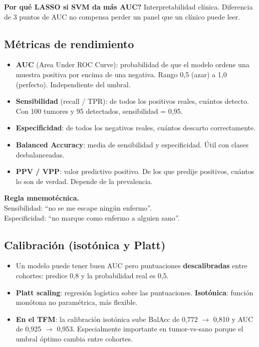 \documentclass[11pt, a4paper]{article}
\begin{document}
\begin{tipbox}
\textbf{Por qu\'e LASSO si SVM da m\'as AUC?} Interpretabilidad cl\'inica. Diferencia de 3 puntos de AUC no compensa perder un panel que un cl\'inico puede leer.
\end{tipbox}

\subsection{M\'etricas de rendimiento}

\begin{itemize}[leftmargin=1.2em, itemsep=2pt]
  \item \textbf{AUC} (Area Under ROC Curve): probabilidad de que el modelo ordene una muestra positiva por encima de una negativa. Rango 0,5 (azar) a 1,0 (perfecto). Independiente del umbral.
  \item \textbf{Sensibilidad} (recall / TPR): de todos los positivos reales, cu\'antos detecto. Con 100 tumores y 95 detectados, sensibilidad = 0,95.
  \item \textbf{Especificidad}: de todos los negativos reales, cu\'antos descarto correctamente.
  \item \textbf{Balanced Accuracy}: media de sensibilidad y especificidad. \'Util con clases desbalanceadas.
  \item \textbf{PPV / VPP}: valor predictivo positivo. De los que predije positivos, cu\'antos lo son de verdad. Depende de la prevalencia.
\end{itemize}

\begin{tipbox}
\textbf{Regla mnemot\'ecnica.}\\
Sensibilidad: ``no se me escape ning\'un enfermo''.\\
Especificidad: ``no marque como enfermo a alguien sano''.
\end{tipbox}

\subsection{Calibraci\'on (isot\'onica y Platt)}

\begin{itemize}[leftmargin=1.2em, itemsep=2pt]
  \item Un modelo puede tener buen AUC pero puntuaciones \textbf{descalibradas} entre cohortes: predice 0,8 y la probabilidad real es 0,5.
  \item \textbf{Platt scaling}: regresi\'on log\'istica sobre las puntuaciones. \textbf{Isot\'onica}: funci\'on mon\'otona no param\'etrica, m\'as flexible.
  \item \textbf{En el TFM}: la calibraci\'on isot\'onica sube BalAcc de 0,772 $\to$ 0,810 y AUC de 0,925 $\to$ 0,953. Especialmente importante en tumor-vs-sano porque el umbral \'optimo cambia entre cohortes.
\end{itemize}
\end{document}
